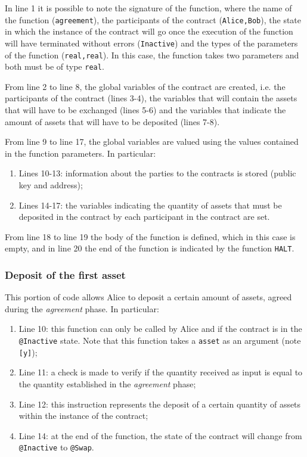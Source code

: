 In line 1 it is possible to note the signature of the function, where the name of the function 
(\verb|agreement|), the participants of the contract (\verb|Alice,Bob|), the state in which the instance 
of the contract will go once the execution of the function will have terminated without errors 
(\verb|Inactive|) and the types of the parameters of the function (\verb|real,real|). In this case, the 
function takes two parameters and both must be of type \verb|real|.

From line 2 to line 8, the global variables of the contract are created, i.e. the participants of the 
contract (lines 3-4), the variables that will contain the assets that will have to be exchanged 
(lines 5-6) and the variables that indicate the amount of assets that will have to be deposited 
(lines 7-8).

From line 9 to line 17, the global variables are valued using the values contained in the function 
parameters. In particular:
\begin{enumerate}
  \item Lines 10-13: information about the parties to the contracts is stored (public key and address);
  \item Lines 14-17: the variables indicating the quantity of assets that must be deposited in the 
  contract by each participant in the contract are set.
\end{enumerate}

From line 18 to line 19 the body of the function is defined, which in this case is empty, and in line 20 
the end of the function is indicated by the function \verb|HALT|.

\subsubsection{Deposit of the first asset}

This portion of code allows Alice to deposit a certain amount of assets, agreed during the 
\textit{agreement} phase. In particular:
\begin{enumerate}
  \item Line 10: this function can only be called by Alice and if the contract is in the \verb|@Inactive| 
  state. Note that this function takes a \verb|asset| as an argument (note \verb|[y]|);
  \item Line 11: a check is made to verify if the quantity received as input is equal to the quantity 
  established in the \textit{agreement} phase;
  \item Line 12: this instruction represents the deposit of a certain quantity of assets within the 
  instance of the contract;
  \item Line 14: at the end of the function, the state of the contract will change from \verb|@Inactive| 
  to \verb|@Swap|.
\end{enumerate}

